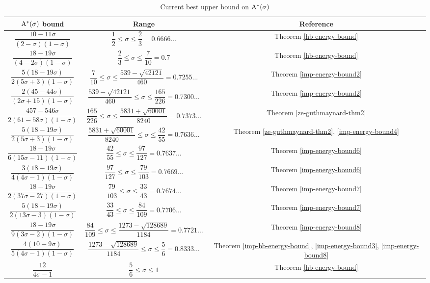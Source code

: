 \begin{table}[ht]
    \def\arraystretch{2}
    \centering
    \caption{Current best upper bound on $\mathrm{A}^*(\sigma)$}
    \begin{tabular}{|c|c|c|}
    \hline
    $\mathrm{A}^*(\sigma)$ bound & Range & Reference\\
    \hline
    $\dfrac{10 - 11\sigma}{(2 - \sigma)(1 - \sigma)}$ & $\dfrac{1}{2} \leq \sigma \le \dfrac{2}{3} = 0.6666\ldots$ & Theorem \ref{hb-energy-bound}\\
    \hline
    $\dfrac{18 - 19\sigma}{(4 - 2\sigma)(1 - \sigma)}$ & $\dfrac{2}{3} \leq \sigma \le \dfrac{7}{10} = 0.7$ & Theorem \ref{hb-energy-bound}\\
    \hline
    $\dfrac{5(18 - 19\sigma)}{2(5\sigma + 3)(1 - \sigma)}$ & $\dfrac{7}{10} \leq \sigma \le \dfrac{539 - \sqrt{42121}}{460} = 0.7255\ldots$ & Theorem \ref{imp-energy-bound2}\\
    \hline
    $\dfrac{2(45 - 44\sigma)}{(2\sigma + 15)(1 - \sigma)}$ & $\dfrac{539 - \sqrt{42121}}{460} \leq \sigma \le \dfrac{165}{226} = 0.7300\ldots$ & Theorem \ref{imp-energy-bound2}\\
    \hline
    $\dfrac{457 - 546\sigma}{2(61 - 58\sigma)(1-\sigma)}$ & $\dfrac{165}{226} \leq \sigma \le \dfrac{5831 + \sqrt{60001}}{8240} = 0.7373\ldots$ & Theorem \ref{ze-guthmaynard-thm2}\\
    \hline
    $\dfrac{5(18 - 19\sigma)}{2(5\sigma + 3)(1 - \sigma)}$ & $\dfrac{5831 + \sqrt{60001}}{8240} \leq \sigma \le \dfrac{42}{55} = 0.7636\ldots$ & Theorem \ref{ze-guthmaynard-thm2}, \ref{imp-energy-bound4}\\
    \hline
    $\dfrac{18 - 19\sigma}{6(15\sigma - 11)(1- \sigma)}$ & $\dfrac{42}{55} \leq \sigma \le \dfrac{97}{127} = 0.7637\ldots$ & Theorem \ref{imp-energy-bound6}\\
    \hline
    $\dfrac{3(18-19\sigma)}{4(4\sigma-1)(1 - \sigma)}$ & $\dfrac{97}{127} \leq \sigma \le \dfrac{79}{103} = 0.7669\ldots$ & Theorem \ref{imp-energy-bound6}\\
    \hline
    $\dfrac{18 - 19\sigma}{2(37\sigma - 27)(1 - \sigma)}$ & $\dfrac{79}{103} \leq \sigma \le \dfrac{33}{43} = 0.7674\ldots$ & Theorem \ref{imp-energy-bound7}\\
    \hline
    $\dfrac{5(18 - 19\sigma)}{2(13\sigma - 3)(1 - \sigma)}$ & $\dfrac{33}{43} \leq \sigma \le \dfrac{84}{109} = 0.7706\ldots$ & Theorem \ref{imp-energy-bound7}\\
    \hline
    $\dfrac{18 - 19\sigma}{9(3\sigma - 2)(1 - \sigma)}$ & $\dfrac{84}{109} \leq \sigma \le \dfrac{1273 - \sqrt{128689}}{1184} = 0.7721\ldots$ & Theorem \ref{imp-energy-bound8}\\
    \hline
    $\dfrac{4(10 - 9\sigma)}{5(4\sigma - 1)(1 - \sigma)}$ & $\dfrac{1273 - \sqrt{128689}}{1184} \leq \sigma \le \dfrac{5}{6} = 0.8333\ldots$ & Theorem \ref{imp-hb-energy-bound}, \ref{imp-energy-bound3}, \ref{imp-energy-bound8}\\
    \hline
    $\dfrac{12}{4\sigma - 1}$ & $\dfrac{5}{6} \leq \sigma \le 1$ & Theorem \ref{hb-energy-bound}\\
    \hline
    \end{tabular}
    \label{zero-density-energy-estimates-table}
\end{table}

